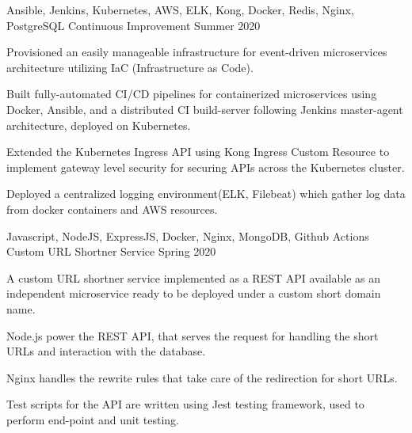 \begin{cventries}
  \cventry
    {Ansible, Jenkins, Kubernetes, AWS, ELK, Kong, Docker, Redis, Nginx, PostgreSQL} %
    {Continuous Improvement} %
    {} %
    {Summer 2020} %
    {
      \begin{cvitems} %
        \item {Provisioned an easily manageable infrastructure for event-driven microservices architecture utilizing IaC (Infrastructure as Code).}
        \item {Built fully-automated CI/CD pipelines for containerized microservices using Docker, Ansible, and a distributed CI build-server following Jenkins master-agent architecture, deployed on Kubernetes.}
        \item {Extended the Kubernetes Ingress API using Kong Ingress Custom Resource to implement gateway level security for securing APIs across the Kubernetes cluster.}
        \item {Deployed a centralized logging environment(ELK, Filebeat) which gather log data from docker containers and AWS resources.}
      \end{cvitems}
    }

  \cventry
    {Javascript, NodeJS, ExpressJS, Docker, Nginx, MongoDB, Github Actions} %
    {Custom URL Shortner Service} %
    {} %
    {Spring 2020} %
    {
      \begin{cvitems} %
        \item {A custom URL shortner service implemented as a REST API available as an independent microservice ready to be deployed under a custom short domain name.}
        \item {Node.js power the REST API, that serves the request for handling the short URLs and interaction with the database.}
        \item {Nginx handles the rewrite rules that take care of the redirection for short URLs.}
        \item {Test scripts for the API are written using Jest testing framework, used to perform end-point and unit testing.}
      \end{cvitems}
    }


\end{cventries}
